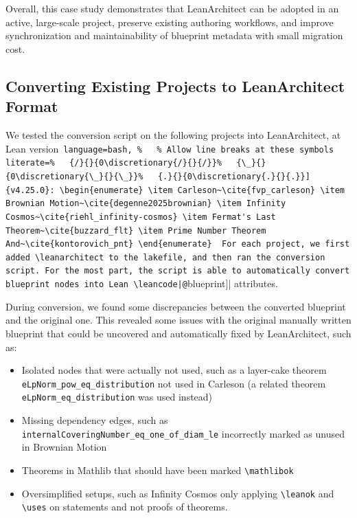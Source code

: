 \documentclass{article}
\newcommand{\leanarchitect}{LeanArchitect\xspace}
\newcommand\latexcode{\lstinline[language={[latex]tex},keywordstyle=\ttfamily\color{black}]}
\newcommand\leancode{\lstinline[language=lean]}
\newcommand\bashcode{\lstinline[language=bash, %
  % Allow line breaks at these symbols
  literate=%
  {/}{}{0\discretionary{/}{}{/}}%
  {\_}{}{0\discretionary{\_}{}{\_}}%
  {.}{}{0\discretionary{.}{}{.}}]}
\begin{document}
Overall, this case study demonstrates that \leanarchitect can be adopted in an active, large-scale project, preserve existing authoring workflows, and improve synchronization and maintainability of blueprint metadata with small migration cost.

\subsection{Converting Existing Projects to \leanarchitect Format}
\label{sec:case-study-convert}

We tested the conversion script on the following projects into \leanarchitect, at Lean version~\bashcode{v4.25.0}:
\begin{enumerate}
\item Carleson~\cite{fvp_carleson}
\item Brownian Motion~\cite{degenne2025brownian}
\item Infinity Cosmos~\cite{riehl_infinity-cosmos}
\item Fermat's Last Theorem~\cite{buzzard_flt}
\item Prime Number Theorem And~\cite{kontorovich_pnt}
\end{enumerate}

For each project, we first added \leanarchitect to the lakefile, and then ran the conversion script. For the most part, the script is able to automatically convert blueprint nodes into Lean \leancode|@[blueprint]| attributes.

During conversion, we found some discrepancies between the converted blueprint and the original one. This revealed some issues with the original manually written blueprint that could be uncovered and automatically fixed by \leanarchitect, such as:
\begin{itemize}
  \item Isolated nodes that were actually not used, such as a layer-cake theorem \leancode{eLpNorm_pow_eq_distribution} not used in Carleson (a related theorem \leancode{eLpNorm_eq_distribution} was used instead)
  \item Missing dependency edges, such as \leancode{internalCoveringNumber_eq_one_of_diam_le} incorrectly marked as unused in Brownian Motion
  \item Theorems in Mathlib that should have been marked \latexcode{\mathlibok}
  \item Oversimplified setups, such as Infinity Cosmos only applying \latexcode{\leanok} and \latexcode{\uses} on statements and not proofs of theorems.
\end{itemize}
\end{document}
